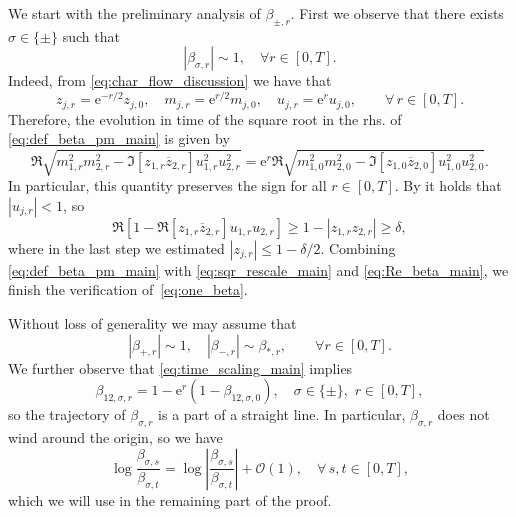 \documentclass[10pt]{amsart}
\numberwithin{equation}{section}
\newcommand{\ee}{\mathrm{e}}
\begin{document}
We start with the preliminary analysis of $\beta_{\pm,r}$. First we observe that there exists $\sigma \in \{\pm\}$ such that 
\begin{equation}
|\beta_{\sigma, r}|\sim 1,\quad \forall r\in [0,T].
\label{eq:one_beta}
\end{equation}
Indeed, from \eqref{eq:char_flow_discussion} we have that
\begin{equation}
z_{j,r}=\ee^{-r/2}z_{j,0},\quad m_{j,r}=\ee^{r/2} m_{j,0},\quad u_{j,r}=\ee^r u_{j,0},\qquad \forall \,r\in [0,T].
\label{eq:time_scaling_main}
\end{equation}
Therefore, the evolution in time of the square root in the rhs. of \eqref{eq:def_beta_pm_main} is given by
\begin{equation}
\Re\sqrt{m_{1,r}^2m_{2,r}^2 - \Im \left[z_{1,r}\overline{z}_{2,r}\right]u_{1,r}^2u_{2,r}^2} = \ee^r \Re\sqrt{m_{1,0}^2m_{2,0}^2 - \Im \left[z_{1,0}\overline{z}_{2,0}\right]u_{1,0}^2u_{2,0}^2}. 
\label{eq:sqr_rescale_main}
\end{equation}
In particular, this quantity preserves the sign for all $r\in[0,T]$. By \cite[Eq. (3.5)]{macroCLT_real} it holds that $|u_{j,r}|<1$, so
\begin{equation}
\Re\left[ 1-\Re [z_{1,r}\overline{z}_{2,r}]u_{1,r}u_{2,r}\right] \ge 1-|z_{1,r}z_{2,r}|\ge \delta,
\label{eq:Re_beta_main}
\end{equation}
where in the last step we estimated $|z_{j,r}|\le 1-\delta/2$. Combining \eqref{eq:def_beta_pm_main} with \eqref{eq:sqr_rescale_main} and \eqref{eq:Re_beta_main}, we finish the verification of~\eqref{eq:one_beta}.

Without loss of generality we may assume that
\begin{equation}
|\beta_{+,r}|\sim 1,\quad |\beta_{-,r}|\sim \beta_{*,r},\qquad \forall r\in [0,T].
\label{eq:beta_relations}
\end{equation}
We further observe that \eqref{eq:time_scaling_main} implies
\begin{equation}
\beta_{12,\sigma,r} = 1-\ee^{r}(1-\beta_{12,\sigma,0}),\quad \sigma\in\{\pm\},\,\, r\in [0,T],
\label{eq:beta_time_dep_main}
\end{equation}
so the trajectory of $\beta_{\sigma,r}$ is a part of a straight line. In particular, $\beta_{\sigma,r}$ does not wind around the origin, so we have
\begin{equation}
\log\frac{\beta_{\sigma,s}}{\beta_{\sigma,t}} = \log\left\vert \frac{\beta_{\sigma,s}}{\beta_{\sigma,t}}\right\vert +\mathcal{O}(1),\quad \forall\, s,t\in [0,T], 
\label{eq:Im_log}
\end{equation} 
which we will use in the remaining part of the proof.
\end{document}
